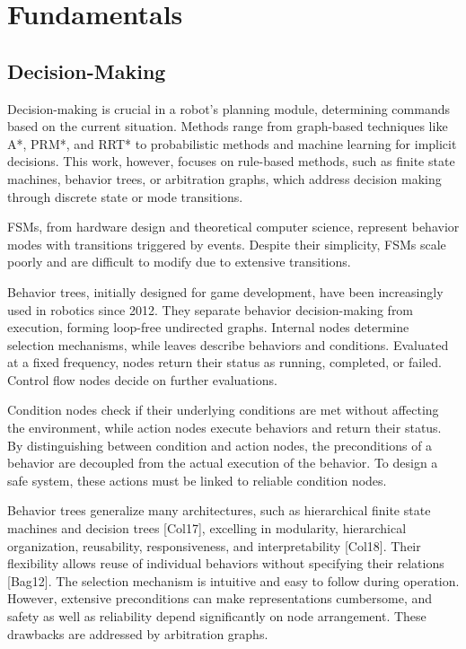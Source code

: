
\section{Fundamentals}


\subsection{Decision-Making}

Decision-making is crucial in a robot's planning module, determining commands based on the current situation.
Methods range from graph-based techniques like A*, PRM*, and RRT* to probabilistic methods and machine learning for implicit decisions.
This work, however, focuses on rule-based methods, such as finite state machines, behavior trees, or arbitration graphs, which address decision making through discrete state or mode transitions.

FSMs, from hardware design and theoretical computer science, represent behavior modes with transitions triggered by events. Despite their simplicity, FSMs scale poorly and are difficult to modify due to extensive transitions.

Behavior trees, initially designed for game development, have been increasingly used in robotics since 2012.
They separate behavior decision-making from execution, forming loop-free undirected graphs.
Internal nodes determine selection mechanisms, while leaves describe behaviors and conditions.
Evaluated at a fixed frequency, nodes return their status as running, completed, or failed.
Control flow nodes decide on further evaluations.

Condition nodes check if their underlying conditions are met without affecting the environment, while action nodes execute behaviors and return their status.
By distinguishing between condition and action nodes, the preconditions of a behavior are decoupled from the actual execution of the behavior.
To design a safe system, these actions must be linked to reliable condition nodes.

Behavior trees generalize many architectures, such as hierarchical finite state machines and decision trees [Col17], excelling in modularity, hierarchical organization, reusability, responsiveness, and interpretability [Col18].
Their flexibility allows reuse of individual behaviors without specifying their relations [Bag12].
The selection mechanism is intuitive and easy to follow during operation.
However, extensive preconditions can make representations cumbersome, and safety as well as reliability depend significantly on node arrangement.
These drawbacks are addressed by arbitration graphs.

